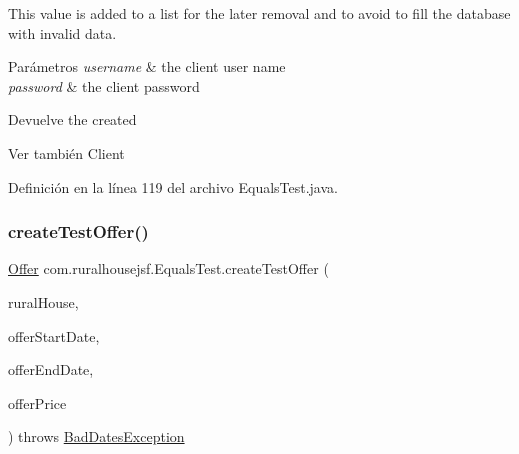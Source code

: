 This value is added to a list for the later removal and to avoid to fill the database with invalid data.


\begin{DoxyParams}{Parámetros}
{\em username} & the client user name \\
\hline
{\em password} & the client password\\
\hline
\end{DoxyParams}
\begin{DoxyReturn}{Devuelve}
the created
\begin{DoxyCode}{0}
\end{DoxyCode}

\end{DoxyReturn}
\begin{DoxySeeAlso}{Ver también}
Client 
\end{DoxySeeAlso}


Definición en la línea 119 del archivo Equals\+Test.\+java.

\mbox{\label{classcom_1_1ruralhousejsf_1_1_equals_test_a322f0b87565b40ecb1d9d0e6246ebaa0}} 
\subsubsection{\texorpdfstring{createTestOffer()}{createTestOffer()}}
{\footnotesize\ttfamily \mbox{\hyperlink{classcom_1_1ruralhousejsf_1_1domain_1_1_offer}{Offer}} com.\+ruralhousejsf.\+Equals\+Test.\+create\+Test\+Offer (\begin{DoxyParamCaption}\item[{\mbox{\hyperlink{classcom_1_1ruralhousejsf_1_1domain_1_1_rural_house}{Rural\+House}}}]{rural\+House,  }\item[{Local\+Date}]{offer\+Start\+Date,  }\item[{Local\+Date}]{offer\+End\+Date,  }\item[{double}]{offer\+Price }\end{DoxyParamCaption}) throws \mbox{\hyperlink{classcom_1_1ruralhousejsf_1_1exceptions_1_1_bad_dates_exception}{Bad\+Dates\+Exception}}\hspace{0.3cm}{\ttfamily [private]}}



